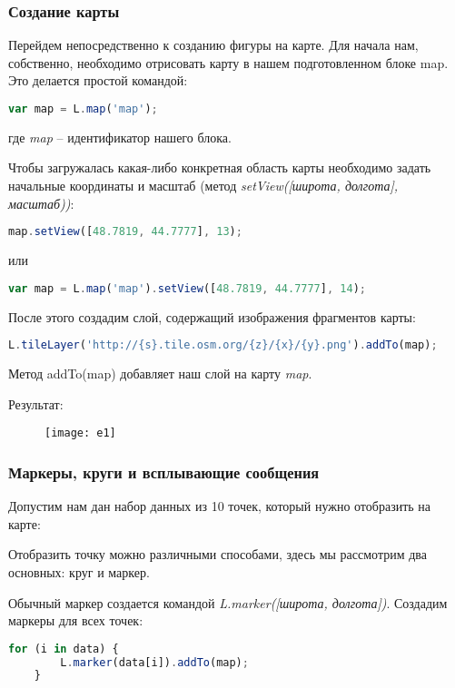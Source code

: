 \subsubsection{Создание карты}
Перейдем непосредственно к созданию фигуры на карте. Для начала нам, 
собственно, необходимо отрисовать карту в нашем подготовленном блоке map. 
Это делается простой командой:
\begin{lstlisting}[language=js]
    var map = L.map('map');
\end{lstlisting}
где \emph{map} -- идентификатор нашего блока.

Чтобы загружалась какая-либо конкретная область карты необходимо задать 
начальные координаты и масштаб (метод 
\emph{setView([широта, долгота], масштаб))}:
\begin{lstlisting}[language=js]
    map.setView([48.7819, 44.7777], 13);
\end{lstlisting}
или
\begin{lstlisting}[language=js]
    var map = L.map('map').setView([48.7819, 44.7777], 14);
\end{lstlisting}

После этого создадим слой, содержащий изображения фрагментов карты:
\begin{lstlisting}[language=js]
    L.tileLayer('http://{s}.tile.osm.org/{z}/{x}/{y}.png').addTo(map);
\end{lstlisting}
Метод addTo(map) добавляет наш слой на карту \emph{map}.

Результат:
\begin{figure}[ht!]
    \center
    \texttt{[image: e1]}
\end{figure}

\subsubsection{Маркеры, круги и всплывающие сообщения}
Допустим нам дан набор данных из 10 точек, который нужно отобразить на карте:


Отобразить точку можно различными способами, здесь мы рассмотрим два 
основных: круг и маркер.

Обычный маркер создается командой \emph{L.marker([широта, долгота])}. 
Создадим маркеры для всех точек:
\begin{lstlisting}[language=js]
    for (i in data) {
        L.marker(data[i]).addTo(map);
    }
\end{lstlisting}

